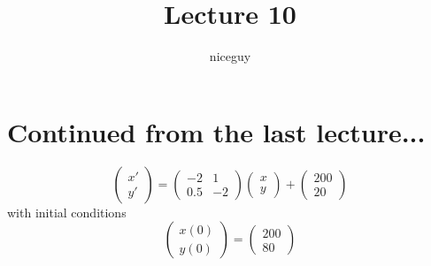 \documentclass[12pt]{article}
\author{niceguy}
\title{Lecture 10}
\begin{document}
\maketitle

\section{Continued from the last lecture...}

$$\begin{pmatrix} x' \\ y' \end{pmatrix} = \begin{pmatrix} -2 & 1 \\ 0.5 & -2 \end{pmatrix} \begin{pmatrix} x \\ y \end{pmatrix} + \begin{pmatrix} 200 \\ 20 \end{pmatrix}$$
with initial conditions
$$\begin{pmatrix} x(0) \\ y(0) \end{pmatrix} = \begin{pmatrix} 200 \\ 80 \end{pmatrix}$$
\end{document}
